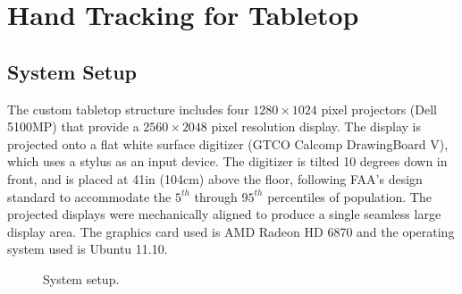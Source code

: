 \section{Hand Tracking for Tabletop}
\subsection{System Setup}
The custom tabletop structure includes four $1280\times1024$ pixel projectors 
(Dell 5100MP) that provide a $2560\times2048$ pixel resolution display. The
display is projected onto a flat white surface digitizer (GTCO Calcomp DrawingBoard V), 
which uses a stylus as an input device. The digitizer is tilted 10 degrees down 
in front, and is placed at 41in (104cm) above the floor, following FAA's design 
standard to accommodate the $5^{th}$ through $95^{th}$ percentiles of 
population. The projected displays were mechanically aligned to produce a single 
seamless large display area. The graphics card used is AMD
Radeon HD 6870 and the operating system used is Ubuntu 11.10.

\begin{figure}
  \centering
  \caption{System setup.} \label{fig:setup}
\end{figure}

